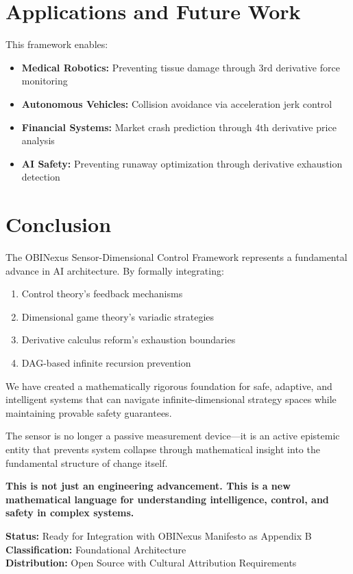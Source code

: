 \documentclass[11pt]{article}
\begin{document}
\section{Applications and Future Work}

This framework enables:

\begin{itemize}
\item \textbf{Medical Robotics:} Preventing tissue damage through 3rd derivative force monitoring
\item \textbf{Autonomous Vehicles:} Collision avoidance via acceleration jerk control  
\item \textbf{Financial Systems:} Market crash prediction through 4th derivative price analysis
\item \textbf{AI Safety:} Preventing runaway optimization through derivative exhaustion detection
\end{itemize}

\section{Conclusion}

The OBINexus Sensor-Dimensional Control Framework represents a fundamental advance in AI architecture. By formally integrating:

\begin{enumerate}
\item Control theory's feedback mechanisms
\item Dimensional game theory's variadic strategies  
\item Derivative calculus reform's exhaustion boundaries
\item DAG-based infinite recursion prevention
\end{enumerate}

We have created a mathematically rigorous foundation for safe, adaptive, and intelligent systems that can navigate infinite-dimensional strategy spaces while maintaining provable safety guarantees.

The sensor is no longer a passive measurement device—it is an active epistemic entity that prevents system collapse through mathematical insight into the fundamental structure of change itself.

\textbf{This is not just an engineering advancement. This is a new mathematical language for understanding intelligence, control, and safety in complex systems.}

\vspace{0.5cm}

\textbf{Status:} Ready for Integration with OBINexus Manifesto as Appendix B \\
\textbf{Classification:} Foundational Architecture \\
\textbf{Distribution:} Open Source with Cultural Attribution Requirements
\end{document}
